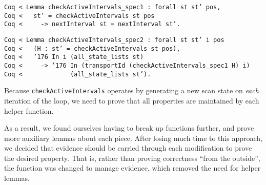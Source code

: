 \documentclass{llncs}
\begin{document}

\begin{flushleft}
\texttt{Coq~{<}~Lemma~checkActiveIntervals\_spec1~:~forall~st~st'~pos,}\\
\texttt{Coq~{<}~~~st'~=~checkActiveIntervals~st~pos}\\
\texttt{Coq~{<}~~~~~-{>}~nextInterval~st~=~nextInterval~st'.}\\
\end{flushleft}

\begin{flushleft}
\texttt{Coq~{<}~Lemma~checkActiveIntervals\_spec2~:~forall~st~st'~i~pos}\\
\texttt{Coq~{<}~~~(H~:~st'~=~checkActiveIntervals~st~pos),}\\
\texttt{Coq~{<}~~~{\char'176}~In~i~(all\_state\_lists~st)}\\
\texttt{Coq~{<}~~~~~-{>}~{\char'176}~In~(transportId~(checkActiveIntervals\_spec1~H)~i)}\\
\texttt{Coq~{<}~~~~~~~~~~~~~(all\_state\_lists~st').}\\
\end{flushleft}

Because \texttt{checkActiveIntervals} operates by generating a new scan state
on \emph{each} iteration of the loop, we need to prove that all properties are
maintained by each helper function.


As a result, we found ourselves having to break up functions further, and
prove more auxiliary lemmas about each piece.  After losing much time to this
approach, we decided that evidence should be carried through each modification
to prove the desired property.  That is, rather than proving correctness
``from the outside'', the function was changed to manage evidence, which
removed the need for helper lemmas.
\end{document}
